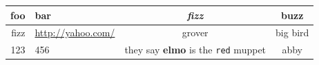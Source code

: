 
\begin{tabular}{r l c c}
  foo & bar & \emph{fizz} & buzz \\
  \hline
  fizz & \url{http://yahoo.com/} & grover & big bird \\
  123 & 456 & they say \textbf{elmo} is the \verb|red|  muppet & abby \\
\end{tabular}